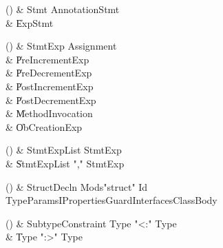 \begin{bbgrammarappendix}

() & Stmt \label{prod:Stmt}  \: AnnotationStmt  \\

 &    \| ExpStmt \\

\end{bbgrammarappendix}

\begin{bbgrammarappendix}

() & StmtExp \label{prod:StmtExp}  \: Assignment  \\

 &    \| PreIncrementExp \\
 &    \| PreDecrementExp \\
 &    \| PostIncrementExp \\
 &    \| PostDecrementExp \\
 &    \| MethodInvocation \\
 &    \| ObCreationExp \\

\end{bbgrammarappendix}

\begin{bbgrammarappendix}

() & StmtExpList \label{prod:StmtExpList}  \: StmtExp  \\

 &    \| StmtExpList \xcd"," StmtExp \\

\end{bbgrammarappendix}

\begin{bbgrammarappendix}

() & StructDecln \label{prod:StructDecln}  \: Mods\opt \xcd"struct" Id TypeParamsI\opt Properties\opt Guard\opt Interfaces\opt ClassBody  \\


\end{bbgrammarappendix}

\begin{bbgrammarappendix}

() & SubtypeConstraint \label{prod:SubtypeConstraint}  \: Type  \xcd"<:" Type   \\

 &    \| Type  \xcd":>" Type  \\

\end{bbgrammarappendix}


